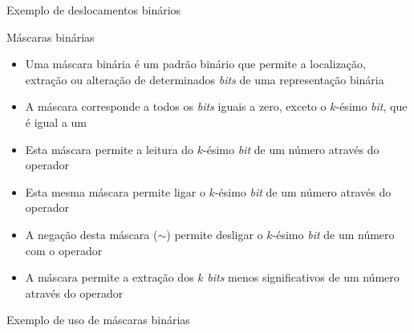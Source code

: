 \begin{frame}[fragile]{Exemplo de deslocamentos binários}
\end{frame}

\begin{frame}[fragile]{Máscaras binárias}

    \begin{itemize}
        \item Uma máscara binária é um padrão binário que permite a localização, extração ou
            alteração de determinados \textit{bits} de uma representação binária

        \item A máscara  corresponde a todos os \textit{bits} iguais a zero,
            exceto o $k$-ésimo \textit{bit}, que é igual a um

        \item Esta máscara permite a leitura do $k$-ésimo \textit{bit} de um número através do
            operador 

        \item Esta mesma máscara permite ligar o $k$-ésimo \textit{bit} de um número através do 
            operador 

        \item A negação desta máscara ($\sim$) permite desligar o $k$-ésimo
            \textit{bit} de um número com o operador 

        \item A máscara  permite a extração dos $k$ \textit{bits} menos
            significativos de um número através do operador 
    \end{itemize}

\end{frame}

\begin{frame}[fragile]{Exemplo de uso de máscaras binárias}
\end{frame}

